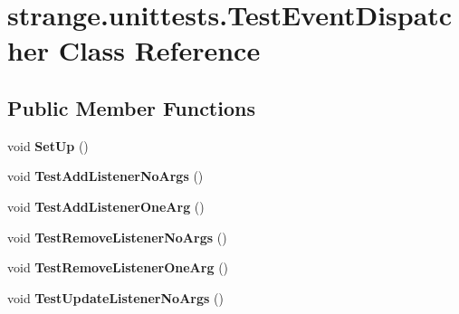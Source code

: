 \hypertarget{classstrange_1_1unittests_1_1_test_event_dispatcher}{\section{strange.\-unittests.\-Test\-Event\-Dispatcher Class Reference}
\label{classstrange_1_1unittests_1_1_test_event_dispatcher}
}
\subsection*{Public Member Functions}
\begin{DoxyCompactItemize}
\item 
\hypertarget{classstrange_1_1unittests_1_1_test_event_dispatcher_aa15e17c1a21069e6b50eafabf65eba82}{void {\bfseries Set\-Up} ()}\label{classstrange_1_1unittests_1_1_test_event_dispatcher_aa15e17c1a21069e6b50eafabf65eba82}

\item 
\hypertarget{classstrange_1_1unittests_1_1_test_event_dispatcher_a2f167d49e367c30dd6294b29d5c8d9ef}{void {\bfseries Test\-Add\-Listener\-No\-Args} ()}\label{classstrange_1_1unittests_1_1_test_event_dispatcher_a2f167d49e367c30dd6294b29d5c8d9ef}

\item 
\hypertarget{classstrange_1_1unittests_1_1_test_event_dispatcher_ad049da182a2811394a8f7e5d0bc4f633}{void {\bfseries Test\-Add\-Listener\-One\-Arg} ()}\label{classstrange_1_1unittests_1_1_test_event_dispatcher_ad049da182a2811394a8f7e5d0bc4f633}

\item 
\hypertarget{classstrange_1_1unittests_1_1_test_event_dispatcher_ad0a9a13f9feb3ccf8f1e5505bd8e4d37}{void {\bfseries Test\-Remove\-Listener\-No\-Args} ()}\label{classstrange_1_1unittests_1_1_test_event_dispatcher_ad0a9a13f9feb3ccf8f1e5505bd8e4d37}

\item 
\hypertarget{classstrange_1_1unittests_1_1_test_event_dispatcher_ae5af254b9a3ed90c5d9f365078076c63}{void {\bfseries Test\-Remove\-Listener\-One\-Arg} ()}\label{classstrange_1_1unittests_1_1_test_event_dispatcher_ae5af254b9a3ed90c5d9f365078076c63}

\item 
\hypertarget{classstrange_1_1unittests_1_1_test_event_dispatcher_a261953a424722ebd6dd1bedf1d6213e8}{void {\bfseries Test\-Update\-Listener\-No\-Args} ()}\label{classstrange_1_1unittests_1_1_test_event_dispatcher_a261953a424722ebd6dd1bedf1d6213e8}


\end{DoxyCompactItemize}

